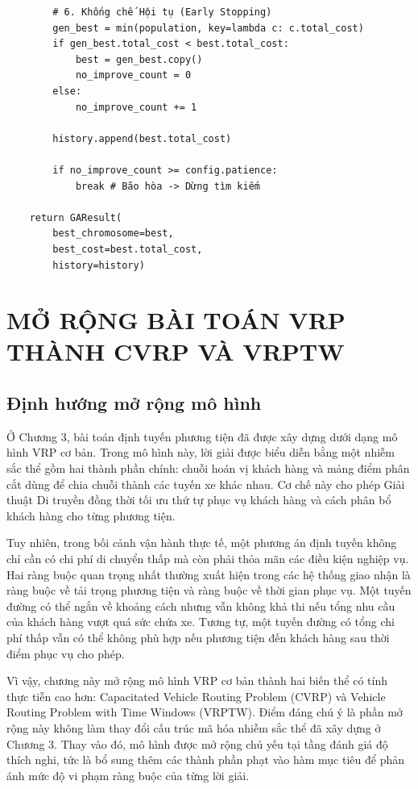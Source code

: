 \documentclass[12pt,a4paper]{article}
\numberwithin{figure}{subsection}
\numberwithin{table}{subsection}
\newcounter{codecounter}
\newenvironment{codeblock}[2]{%
    \refstepcounter{codecounter}%
    \phantomsection%
    \label{#1}%
    \par\smallskip
}{%
    \par\smallskip
}
\begin{document}
\begin{codeblock}{app:code:ga-loop}{Vòng lặp GA trung tâm}
\begin{verbatim}
        # 6. Khống chế Hội tụ (Early Stopping)
        gen_best = min(population, key=lambda c: c.total_cost)
        if gen_best.total_cost < best.total_cost:
            best = gen_best.copy()
            no_improve_count = 0
        else:
            no_improve_count += 1

        history.append(best.total_cost)

        if no_improve_count >= config.patience:
            break # Bão hòa -> Dừng tìm kiếm

    return GAResult(
        best_chromosome=best, 
        best_cost=best.total_cost, 
        history=history)
\end{verbatim}
\end{codeblock}

\section{MỞ RỘNG BÀI TOÁN VRP THÀNH CVRP VÀ VRPTW}

\subsection{Định hướng mở rộng mô hình}

Ở Chương 3, bài toán định tuyến phương tiện đã được xây dựng dưới dạng mô hình VRP cơ bản. Trong mô hình này, lời giải được biểu diễn bằng một nhiễm sắc thể gồm hai thành phần chính: chuỗi hoán vị khách hàng và mảng điểm phân cắt dùng để chia chuỗi thành các tuyến xe khác nhau. Cơ chế này cho phép Giải thuật Di truyền đồng thời tối ưu thứ tự phục vụ khách hàng và cách phân bổ khách hàng cho từng phương tiện.

Tuy nhiên, trong bối cảnh vận hành thực tế, một phương án định tuyến không chỉ cần có chi phí di chuyển thấp mà còn phải thỏa mãn các điều kiện nghiệp vụ. Hai ràng buộc quan trọng nhất thường xuất hiện trong các hệ thống giao nhận là ràng buộc về tải trọng phương tiện và ràng buộc về thời gian phục vụ. Một tuyến đường có thể ngắn về khoảng cách nhưng vẫn không khả thi nếu tổng nhu cầu của khách hàng vượt quá sức chứa xe. Tương tự, một tuyến đường có tổng chi phí thấp vẫn có thể không phù hợp nếu phương tiện đến khách hàng sau thời điểm phục vụ cho phép.

Vì vậy, chương này mở rộng mô hình VRP cơ bản thành hai biến thể có tính thực tiễn cao hơn: Capacitated Vehicle Routing Problem (CVRP) và Vehicle Routing Problem with Time Windows (VRPTW). Điểm đáng chú ý là phần mở rộng này không làm thay đổi cấu trúc mã hóa nhiễm sắc thể đã xây dựng ở Chương 3. Thay vào đó, mô hình được mở rộng chủ yếu tại tầng đánh giá độ thích nghi, tức là bổ sung thêm các thành phần phạt vào hàm mục tiêu để phản ánh mức độ vi phạm ràng buộc của từng lời giải.
\end{document}
